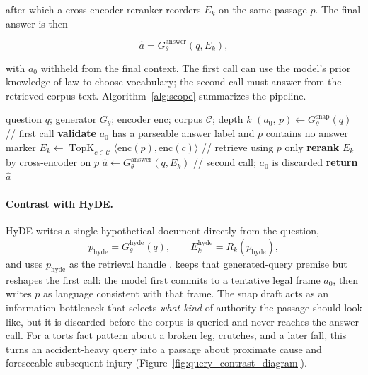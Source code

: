 after which a cross-encoder reranker reorders $E_k$ on the same passage $p$.
The final answer is then

\begin{equation}
\hat{a} = G_{\theta}^{\mathrm{answer}}(q, E_k),
\end{equation}

with $a_0$ withheld from the final context. The first call can use the model's
prior knowledge of law to choose vocabulary; the second call must answer from
the retrieved corpus text. Algorithm~\ref{alg:scope} summarizes the pipeline.

\begin{algorithm}[t]
\caption{\hyre{} pipeline for one legal question.}\label{alg:scope}
\begin{algorithmic}[1]
\REQUIRE question $q$; generator $G_\theta$; encoder $\mathrm{enc}$; corpus $\mathcal{C}$; depth $k$
\STATE $(a_0,\, p) \gets G_{\theta}^{\mathrm{snap}}(q)$ \hfill // first call
\STATE \textbf{validate} $a_0$ has a parseable answer label and $p$ contains no answer marker
\STATE $E_k \gets \operatorname*{TopK}_{c \in \mathcal{C}} \langle \mathrm{enc}(p), \mathrm{enc}(c) \rangle$ \hfill // retrieve using $p$ only
\STATE \textbf{rerank} $E_k$ by cross-encoder on $p$
\STATE $\hat{a} \gets G_{\theta}^{\mathrm{answer}}(q, E_k)$ \hfill // second call; $a_0$ is discarded
\STATE \textbf{return} $\hat{a}$
\end{algorithmic}
\end{algorithm}

\paragraph{Contrast with HyDE.}
HyDE writes a single hypothetical document directly from the question,
\begin{equation}
p_{\mathrm{hyde}} = G_{\theta}^{\mathrm{hyde}}(q), \qquad
E_k^{\mathrm{hyde}} = R_k(p_{\mathrm{hyde}}),
\end{equation}
and uses $p_{\mathrm{hyde}}$ as the retrieval handle \citep{gao2023hyde}. \hyre{}
keeps that generated-query premise but reshapes the first call: the model
first commits to a tentative legal frame $a_0$, then writes $p$ as language
consistent with that frame. The snap draft acts as an information bottleneck
that selects \emph{what kind} of authority the passage should look like, but
it is discarded before the corpus is queried and never reaches the answer
call. For a torts fact pattern about a broken leg, crutches, and a later
fall, this turns an accident-heavy query into a passage about proximate cause
and foreseeable subsequent injury
(Figure~\ref{fig:query_contrast_diagram}).

